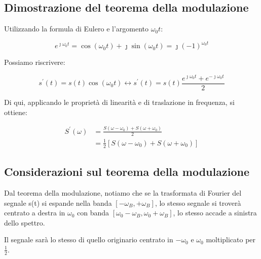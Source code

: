 \subsection{Dimostrazione del teorema della modulazione} 

Utilizzando la formula di Eulero e l'argomento $\omega_0 t$: 

{
    \Large 
    \begin{equation}
        e^{\jmath \omega_0 t} = \cos(\omega_0 t) + \jmath \sin(\omega_0 t) = \jmath(-1)^{\omega_0 t}
    \end{equation}
}

Possiamo riscrivere: 

{
    \Large 
    \begin{equation}
        s^{'} (t) = s(t)\cos(\omega_0 t)
        \leftrightarrow 
        s^{'} (t) = s(t) \frac{e^{\jmath \omega_0 t} + e^{-\jmath \omega_0 t}}{2}
    \end{equation}
} 

Di qui, applicando le proprietà di linearità e di traslazione in frequenza, si ottiene: 

{
    \Large 
    \begin{equation}
        \begin{split}
            S^{'} (\omega) 
        &= 
        \frac{S (\omega - \omega_0) + S (\omega + \omega_0)}{2}
        \\ 
        &= 
        \frac{1}{2}
        [S (\omega - \omega_0) + S (\omega + \omega_0)]
        \end{split}
    \end{equation}
}

\newpage 

\subsection{Considerazioni sul teorema della modulazione} 

Dal teorema della modulazione, notiamo che se la trasformata di Fourier del segnale s(t) si espande 
nella banda $[- \omega_B, +\omega_B]$, lo stesso segnale si troverà centrato a destra in $\omega_0$ con banda 
$[\omega_0 - \omega_B, \omega_0 + \omega_B]$, lo stesso accade a sinistra dello spettro. \newline 

Il segnale sarà lo stesso di quello originario centrato in $- \omega_0$ e $\omega_0$ moltiplicato per $\frac{1}{2}$. \newline 

